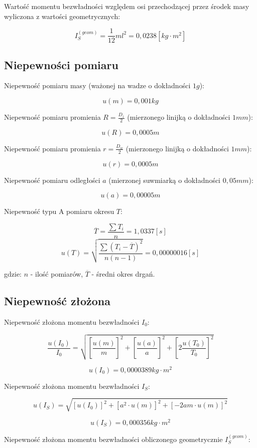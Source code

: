 \documentclass[a4paper,10pt,twoside]{article}
\begin{document}
Wartość momentu bezwładności względem osi przechodzącej przez środek masy wyliczona z wartości geometrycznych:

$$ I_S^{(geom)} = \frac{1}{12}ml^2 = 0,0238 \unit{[kg \cdot m^2]}$$

\subsection{Niepewności pomiaru}

Niepewność pomiaru masy (ważonej na wadze o dokładności $1 \unit{g}$):

$$ u(m) = 0,001 \unit{kg} $$

Niepewność pomiaru promienia $R = \frac{D_z}{2}$ (mierzonego linijką o dokładności $1 \unit{mm}$):

$$ u(R) = 0,0005 \unit{m} $$

Niepewność pomiaru promienia $r = \frac{D_w}{2}$ (mierzonego linijką o dokładności $1 \unit{mm}$):

$$ u(r) = 0,0005 \unit{m} $$

Niepewność pomiaru odległości $a$ (mierzonej suwmiarką o dokładności $0,05 \unit{mm}$):

$$u(a) = 0,00005 \unit{m} $$

Niepewność typu A pomiaru okresu $T$:

$$\overline{T}=\frac{\sum{T_i}}{n}=1,0337 \unit{[s]}$$
$$u(T)=\sqrt{\frac{\sum{(T_i-\overline{T})^2}}{n(n-1)}} = 0,00000016 \unit{[s]}$$

gdzie: $n$ - ilość pomiarów, $\overline{T}$ - średni okres drgań.

\subsection{Niepewność złożona}

Niepewność złożona momentu bezwładności $I_0$:

$$ \frac{u(I_0)}{I_0} = \sqrt{ \left[ \frac{u(m)}{m} \right]^2 + \left[ \frac{u(a)}{a} \right]^2 + \left[ 2 \frac{u(T_0)}{T_0} \right]^2} $$

$$ u(I_0) = 0,0000389 \unit{kg \cdot m^2} $$

Niepewność złożona momentu bezwładności $I_S$:

$$ u(I_S) = \sqrt{ \left[ u(I_0) \right]^2 + \left[ a^2 \cdot u(m) \right]^2 + \left[-2 a m \cdot u(m) \right]^2 } $$

$$ u(I_S) = 0,000356 \unit{kg \cdot m^2} $$


Niepewność złożona momentu bezwładności obliczonego geometrycznie $I_S^{(geom)}$:
\end{document}
